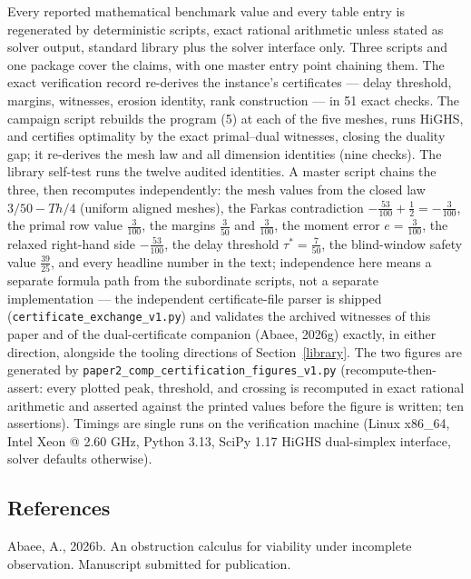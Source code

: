 \documentclass[10pt,twocolumn]{article}
\theoremstyle{plain}
\theoremstyle{definition}
\theoremstyle{remark}
\begin{document}
Every reported mathematical benchmark value and every table entry is
regenerated by deterministic scripts, exact rational arithmetic unless
stated as solver output, standard library plus the solver interface only.
Three scripts and one package cover the claims, with one master entry
point chaining them. The exact
verification record re-derives the instance's certificates --- delay
threshold, margins, witnesses, erosion identity, rank construction ---
in 51 exact checks. The campaign script rebuilds the program (5) at each of
the five meshes, runs HiGHS, and certifies optimality by the exact
primal--dual witnesses, closing the duality gap; it re-derives the mesh law
and all dimension identities (nine checks). The library self-test runs the
twelve audited identities. A master script chains the three, then
recomputes independently: the mesh values from the closed law
\(3/50 - Th/4\) (uniform aligned meshes), the Farkas contradiction
\(-\tfrac{53}{100} + \tfrac12 = -\tfrac{3}{100}\), the primal row value
\(\tfrac{3}{100}\), the margins \(\tfrac{3}{50}\) and \(\tfrac{3}{100}\),
the moment error \(e = \tfrac{3}{100}\), the relaxed right-hand side
\(-\tfrac{53}{100}\), the delay threshold \(\tau^{*} = \tfrac{7}{50}\), the blind-window safety value \(\tfrac{39}{25}\), and every headline
number in the text; independence here means a separate formula path from
the subordinate scripts, not a separate implementation --- the independent
certificate-file parser is shipped (\texttt{certificate\_exchange\_v1.py})
and validates the archived witnesses of this paper and of the
dual-certificate companion (Abaee, 2026g) exactly, in either direction,
alongside the tooling directions of Section~\ref{library}. The two
figures are generated by \texttt{paper2\_comp\_certification\_figures\_v1.py}
(recompute-then-assert: every plotted peak, threshold, and crossing is
recomputed in exact rational arithmetic and asserted against the printed
values before the figure is written; ten assertions). Timings are single runs on the verification
machine (Linux x86\_64, Intel Xeon @ 2.60 GHz, Python 3.13, SciPy 1.17
HiGHS dual-simplex interface, solver defaults otherwise).

\subsection*{References}

Abaee, A., 2026b. An obstruction calculus for viability under incomplete
observation. Manuscript submitted for publication.
\end{document}
